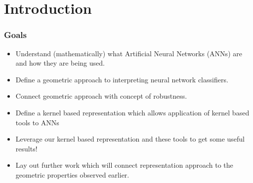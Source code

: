 \section{Introduction} %
\label{Chapter1} %




\begin{frame}
  \frametitle{Goals}
  \begin{itemize}
      \item<1-> Understand (mathematically) what Artificial Neural
        Networks (ANNs) are and how they are being used. 
      \item<2-> Define a geometric approach to interpreting neural
        network classifiers. 
      \item<3-> Connect geometric approach with concept of 
        robustness. 
      \item<4-> Define a kernel based representation which allows application
        of kernel based tools to ANNs
      \item<5-> Leverage our kernel based representation and these
        tools to get some useful results!
      \item<6-> Lay out further work which will connect representation
        approach to the geometric properties observed earlier. 
  \end{itemize}
\end{frame}


